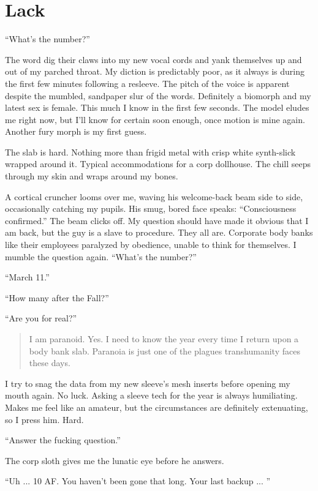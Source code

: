 \chapter{Lack}
\label{chap:lack}

``What's the number?''

The word dig their claws into my new vocal cords and yank themselves
up and out of my parched throat.  My diction is predictably poor, as
it always is during the first few minutes following a resleeve. The
pitch of the voice is apparent despite the mumbled, sandpaper slur of
the words. Definitely a biomorph and my latest sex is female. This
much I know in the first few seconds. The model eludes me right now,
but I'll know for certain soon enough, once motion is mine
again. Another fury morph is my first guess.

The slab is hard. Nothing more than frigid metal with crisp white
synth-slick wrapped around it. Typical accommodations for a corp
dollhouse. The chill seeps through my skin and wraps around my bones.

A cortical cruncher looms over me, waving his welcome-back beam side
to side, occasionally catching my pupils. His smug, bored face speaks:
``Consciousness confirmed.'' The beam clicks off. My question should
have made it obvious that I am back, but the guy is a slave to
procedure. They all are. Corporate body banks like their employees
paralyzed by obedience, unable to think for themselves. I mumble the
question again. ``What's the number?''

``March 11.''

``How many after the Fall?''

``Are you for real?''

\begin{quotation}
  I am paranoid. Yes. I need to know the year every time I return upon
  a body bank slab. Paranoia is just one of the plagues transhumanity
  faces these days.
\end{quotation}

I try to snag the data from my new sleeve's mesh inserts before
opening my mouth again. No luck. Asking a sleeve tech for the year is
always humiliating. Makes me feel like an amateur, but the
circumstances are definitely extenuating, so I press him. Hard.

``Answer the fucking question.''

The corp sloth gives me the lunatic eye before he answers.

``Uh ... 10 AF. You haven't been gone that long. Your last backup ... ''

